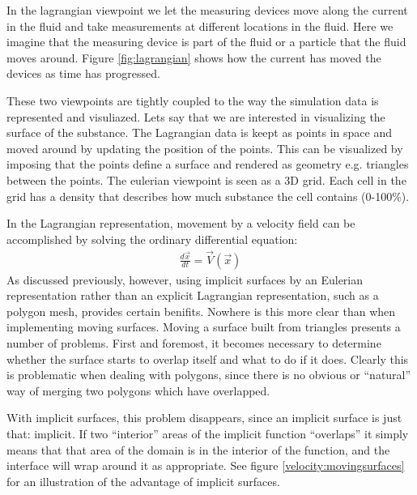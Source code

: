 In the lagrangian viewpoint we let the measuring devices move along
the current in the fluid and take measurements at different locations
in the fluid. Here we imagine that the measuring device is part of the
fluid or a particle that the fluid moves around. Figure
\ref{fig:lagrangian} shows how the current has moved the devices as
time has progressed.

These two viewpoints are tightly coupled to the way the simulation data
is represented and visuliazed. Lets say that we are interested in
visualizing the surface of the substance.
%
The Lagrangian data is keept as points in space and moved around by
updating the position of the points. This can be visualized by
imposing that the points define a surface and rendered as geometry
e.g. triangles between the points.
%
The eulerian viewpoint is seen as a 3D grid. Each cell in the grid has
a density that describes how much substance the cell contains (0-100\%).

In the Lagrangian representation, movement by a velocity field can be
accomplished by solving the ordinary differential equation:
\begin{eqnarray}
\frac{d\vec{x}}{dt} = \vec{V}\left(\vec{x}\right)
\end{eqnarray}
As discussed previously, however, using implicit surfaces by an
Eulerian representation rather than an explicit Lagrangian
representation, such as a polygon mesh, provides certain
benifits. Nowhere is this more clear than when implementing moving
surfaces. Moving a surface built from triangles presents a number of
problems. First and foremost, it becomes necessary to determine
whether the surface starts to overlap itself and what to do if it
does. Clearly this is problematic when dealing with polygons, since
there is no obvious or ``natural'' way of merging two polygons which
have overlapped.


With implicit surfaces, this problem disappears, since an implicit
surface is just that: implicit. If two ``interior'' areas of the
implicit function ``overlaps'' it simply means that that area of the
domain is in the interior of the function, and the interface will wrap
around it as appropriate. See figure \vref{velocity:movingsurfaces}
for an illustration of the advantage of implicit surfaces.

